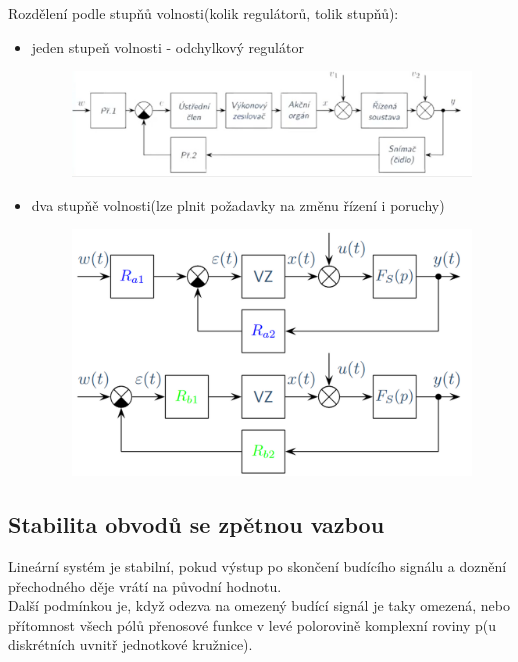 Rozdělení podle stupňů volnosti(kolik regulátorů, tolik stupňů):
\begin{itemize}
    \item jeden stupeň volnosti - odchylkový regulátor
          \begin{figure}[H]
              \includegraphics*[scale = 0.45]{images/jedenStupenVolnostii.png}
          \end{figure}
    \item dva stupňě volnosti(lze plnit požadavky na změnu řízení i poruchy)
          \begin{figure}[H]
              \includegraphics*[scale = 0.4]{images/dvaStupenVolnostii.png}
          \end{figure}
\end{itemize}

\subsection*{Stabilita obvodů se zpětnou vazbou}
Lineární systém je stabilní, pokud výstup po skončení budícího signálu a doznění přechodného děje vrátí na původní hodnotu.\\
Další podmínkou je, když odezva na omezený budící signál je taky omezená, nebo přítomnost všech pólů přenosové funkce v levé polorovině komplexní roviny p(u diskrétních uvnitř jednotkové kružnice).\\


